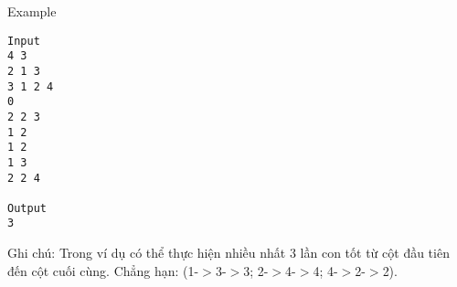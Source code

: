 Example  
\begin{verbatim}
Input
4 3 
2 1 3 
3 1 2 4
0
2 2 3 
1 2 
1 2 
1 3 
2 2 4 

Output
3
\end{verbatim}

   Ghi chú: Trong ví dụ có thể thực hiện nhiều nhất 3 lần con tốt từ cột đầu tiên đến cột cuối cùng. Chẳng hạn: (1-$>$3-$>$3; 2-$>$4-$>$4; 4-$>$2-$>$2).
